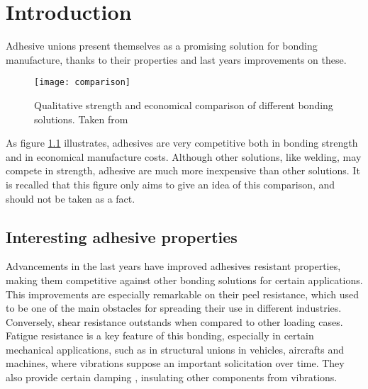 \chapter{Introduction}
\label{0}


Adhesive unions present themselves as a promising solution for bonding manufacture, thanks to their properties and last years improvements on these.

\begin{figure}
\centering
\texttt{[image: comparison]}
\caption{Qualitative strength and economical comparison of different bonding solutions. Taken from \citet{superyacht}}
\label{fig:comparison}
\end{figure}

As figure \ref{fig:comparison} illustrates, adhesives are very competitive both in bonding strength and in economical manufacture costs. Although other solutions, like welding, may compete in strength, adhesive are much more inexpensive than other solutions. It is recalled that this figure only aims to give an idea of this comparison, and should not be taken as a fact.

\section{Interesting adhesive properties}
Advancements in the last years have improved adhesives resistant properties, making them competitive against other bonding solutions for certain applications. This improvements are especially remarkable on their peel resistance, which used to be one of the main obstacles for spreading their use in different industries. Conversely, shear resistance outstands when compared to other loading cases.
Fatigue resistance is a key feature of this bonding, especially in certain mechanical applications, such as in structural unions in vehicles, aircrafts and machines, where vibrations suppose an important solicitation over time. They also provide certain damping \citep{Loureiro2010}, insulating other components from vibrations.

